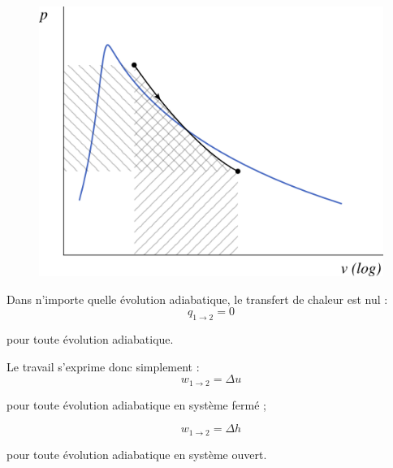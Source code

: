 		\begin{figure}
			\begin{center}
				\includegraphics[width=\pvdiagramwidth]{images/pv_lv_isentropique.png}
			\end{center}
			\label{fig_pv_lv_isentropique}
		\end{figure}

		Dans n’importe quelle évolution adiabatique, le transfert de chaleur est nul :
		\begin{equation}
			q_{1\to2} = 0
			\label{eq_lv_travail_adiabatique}
		\end{equation}
		\begin{equationterms}
			\item pour toute évolution adiabatique.
		\end{equationterms}

		Le travail s’exprime donc simplement :
		\begin{equation}
			w_{1\to2} = \Delta u
			\label{eq_lv_travail_adiabatique_sf}
		\end{equation}
		\begin{equationterms}
			\item pour toute évolution adiabatique en système fermé ;
		\end{equationterms}
		\begin{equation}
			w_{1\to2} = \Delta h
			\label{eq_lv_travail_adiabatique_so}
		\end{equation}
		\begin{equationterms}
			\item pour toute évolution adiabatique en système ouvert.
		\end{equationterms}


